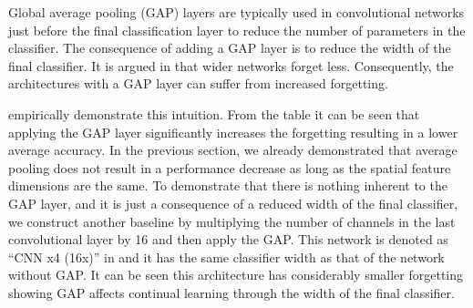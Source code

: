 Global average pooling (GAP) layers are typically used in convolutional networks just before the final classification layer to reduce the number of parameters in the classifier. The consequence of adding a GAP layer is to reduce the width of the final classifier. It is argued in  that wider networks forget less. Consequently, the architectures with a GAP layer can suffer from increased forgetting. 

 empirically demonstrate this intuition. From the table it can be seen that applying the GAP layer significantly increases the forgetting resulting in a lower average accuracy. In the previous section, we already demonstrated that average pooling does not result in a performance decrease as long as the spatial feature dimensions are the same. To demonstrate that there is nothing inherent to the GAP layer, and it is just a consequence of a reduced width of the final classifier, we construct another baseline by multiplying the number of channels in the last convolutional layer by 16 and then apply the GAP. This network is denoted as ``CNN x4 (16x)'' in  and it has the same classifier width as that of the network without GAP. It can be seen this architecture has considerably smaller forgetting showing GAP affects continual learning through the width of the final classifier. 

